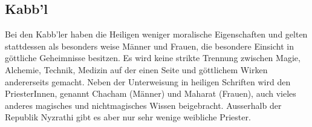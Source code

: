 \documentclass[10pt,twoside,twocolumn,openany]{book}
\begin{document}
%	
%	
%	


\subsection{Kabb'l}

Bei den Kabb'ler haben die Heiligen weniger moralische Eigenschaften und gelten stattdessen als besonders weise Männer und Frauen, die besondere Einsicht in göttliche Geheimnisse besitzen. Es wird keine strikte Trennung zwischen Magie, Alchemie, Technik, Medizin auf der einen Seite und göttlichem Wirken andererseits gemacht. Neben der Unterweisung in heiligen Schriften wird den PriesterInnen, genannt Chacham (Männer) und Maharat (Frauen), auch vieles anderes magisches und nichtmagisches Wissen beigebracht. Ausserhalb der Republik Nyzrathi gibt es aber nur sehr wenige weibliche Priester.
\end{document}
